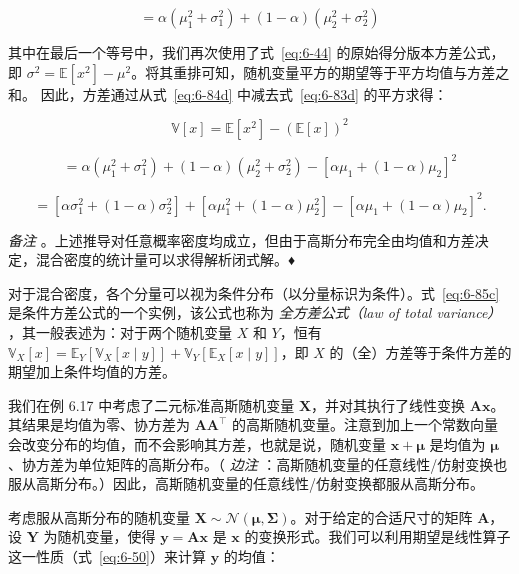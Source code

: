 \begin{equation}
= \alpha(\mu_1^2 + \sigma_1^2) + (1 - \alpha)(\mu_2^2 + \sigma_2^2)
\tag{6.84d}\label{eq:6-84d}
\end{equation}

其中在最后一个等号中，我们再次使用了式~\eqref{eq:6-44} 的原始得分版本方差公式，即 $ \sigma^2 = \mathbb{E}[x^2] - \mu^2 $。将其重排可知，随机变量平方的期望等于平方均值与方差之和。 因此，方差通过从式~\eqref{eq:6-84d} 中减去式~\eqref{eq:6-83d} 的平方求得：

\begin{equation}
\mathbb{V}[x] = \mathbb{E}[x^2] - (\mathbb{E}[x])^2
\tag{6.85a}\label{eq:6-85a}
\end{equation}

\begin{equation}
= \alpha(\mu_1^2 + \sigma_1^2) + (1 - \alpha)(\mu_2^2 + \sigma_2^2) - [\alpha \mu_1 + (1 - \alpha)\mu_2]^2
\tag{6.85b}\label{eq:6-85b}
\end{equation}

\begin{equation}
= [\alpha \sigma_1^2 + (1 - \alpha) \sigma_2^2] + [\alpha \mu_1^2 + (1 - \alpha) \mu_2^2] - [\alpha \mu_1 + (1 - \alpha)\mu_2]^2 .
\tag{6.85c}\label{eq:6-85c}
\end{equation}

\emph{备注} 。上述推导对任意概率密度均成立，但由于高斯分布完全由均值和方差决定，混合密度的统计量可以求得解析闭式解。♦

对于混合密度，各个分量可以视为条件分布（以分量标识为条件）。式~\eqref{eq:6-85c} 是条件方差公式的一个实例，该公式也称为 \emph{全方差公式（law of total variance）} ，其一般表述为：对于两个随机变量 $ X $ 和 $ Y $，恒有 $ \mathbb{V}_X[x] = \mathbb{E}_Y[\mathbb{V}_X[x \mid y]] + \mathbb{V}_Y[\mathbb{E}_X[x \mid y]] $，即 $ X $ 的（全）方差等于条件方差的期望加上条件均值的方差。

我们在例 6.17 中考虑了二元标准高斯随机变量 $ \boldsymbol{X} $，并对其执行了线性变换 $ \boldsymbol{A} \boldsymbol{x} $。其结果是均值为零、协方差为 $ \boldsymbol{A} \boldsymbol{A}^\top $ 的高斯随机变量。注意到加上一个常数向量会改变分布的均值，而不会影响其方差，也就是说，随机变量 $ \boldsymbol{x} + \boldsymbol{\mu} $ 是均值为 $ \boldsymbol{\mu} $、协方差为单位矩阵的高斯分布。（ \emph{边注} ：高斯随机变量的任意线性/仿射变换也服从高斯分布。）因此，高斯随机变量的任意线性/仿射变换都服从高斯分布。

考虑服从高斯分布的随机变量 $ \boldsymbol{X} \sim \mathcal{N}(\boldsymbol{\mu}, \boldsymbol{\Sigma}) $。对于给定的合适尺寸的矩阵 $ \boldsymbol{A} $，设 $ \boldsymbol{Y} $ 为随机变量，使得 $ \boldsymbol{y} = \boldsymbol{A} \boldsymbol{x} $ 是 $ \boldsymbol{x} $ 的变换形式。我们可以利用期望是线性算子这一性质（式~\eqref{eq:6-50}）来计算 $ \boldsymbol{y} $ 的均值：

